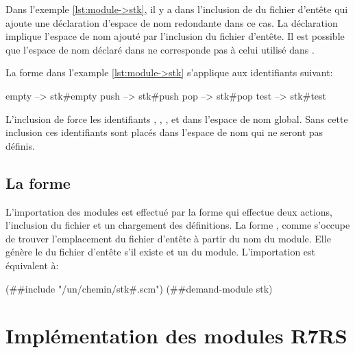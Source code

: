 Dans l'exemple \ref{lst:module->stk}, il y a dans  l'inclusion
de du fichier d'entête  qui ajoute une déclaration d'espace
de nom redondante dans ce cas.  La déclaration 
implique l'espace de nom ajouté par l'inclusion du fichier d'entête. Il est
possible que l'espace de nom déclaré dans  ne corresponde
pas à celui utilisé dans .

La forme  dans l'example \ref{lst:module->stk}
s'applique aux identifiants suivant:
\begin{center}
  \begin{mplisting}{0.3}
empty --> stk#empty
push  --> stk#push
pop   --> stk#pop
test  --> stk#test
\end{mplisting}
\end{center}
L'inclusion de  force les identifiants
, , ,  et
 dans l'espace de nom global. Sans cette inclusion
ces identifiants sont placés dans l'espace de nom  qui
ne seront pas définis.

\subsection{La forme } L'importation des modules est
effectué par la forme  qui effectue deux actions,
l'inclusion du fichier  et un chargement des définitions.
La forme , comme  s'occupe de
trouver l'emplacement du fichier d'entête à partir du nom du module. Elle
génère le  du fichier d'entête s'il existe et un
 du module.  L'importation 
est équivalent à:

\begin{center}
  \begin{mplisting}{0.9}
(##include "/un/chemin/stk#.scm")
(##demand-module stk)
\end{mplisting}
  \label{lst:prim-import->stk}
\end{center}



\section{Implémentation des modules R7RS}

